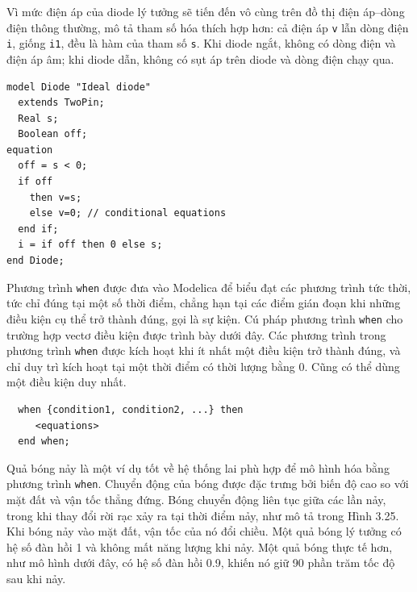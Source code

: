 
Vì mức điện áp của diode lý tưởng sẽ tiến đến vô cùng trên đồ thị điện áp--dòng điện thông thường, mô tả tham số hóa thích hợp hơn: cả điện áp \texttt{v} lẫn dòng điện \texttt{i}, giống \texttt{i1}, đều là hàm của tham số \texttt{s}. Khi diode ngắt, không có dòng điện và điện áp âm; khi diode dẫn, không có sụt áp trên diode và dòng điện chạy qua.
\begin{verbatim}
model Diode "Ideal diode"
  extends TwoPin;
  Real s;
  Boolean off;
equation
  off = s < 0;
  if off
    then v=s;
    else v=0; // conditional equations
  end if;
  i = if off then 0 else s;
end Diode;
\end{verbatim}
Phương trình \texttt{when} được đưa vào Modelica để biểu đạt các phương trình tức thời, tức chỉ đúng tại một số thời điểm, chẳng hạn tại các điểm gián đoạn khi những điều kiện cụ thể trở thành đúng, gọi là sự kiện. Cú pháp phương trình \texttt{when} cho trường hợp vectơ điều kiện được trình bày dưới đây. Các phương trình trong phương trình \texttt{when} được kích hoạt khi ít nhất một điều kiện trở thành đúng, và chỉ duy trì kích hoạt tại một thời điểm có thời lượng bằng 0. Cũng có thể dùng một điều kiện duy nhất.
\begin{verbatim}
  when {condition1, condition2, ...} then
     <equations>
  end when;
\end{verbatim}
Quả bóng nảy là một ví dụ tốt về hệ thống lai phù hợp để mô hình hóa bằng phương trình \texttt{when}. Chuyển động của bóng được đặc trưng bởi biến độ cao so với mặt đất và vận tốc thẳng đứng. Bóng chuyển động liên tục giữa các lần nảy, trong khi thay đổi rời rạc xảy ra tại thời điểm nảy, như mô tả trong Hình 3.25. Khi bóng nảy vào mặt đất, vận tốc của nó đổi chiều. Một quả bóng lý tưởng có hệ số đàn hồi 1 và không mất năng lượng khi nảy. Một quả bóng thực tế hơn, như mô hình dưới đây, có hệ số đàn hồi 0.9, khiến nó giữ 90 phần trăm tốc độ sau khi nảy.


